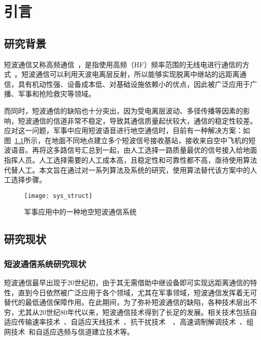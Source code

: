 
\chapter{引言}
\label{chapter:introduction}

\section{研究背景}

短波通信又称高频通信~\cite{胡中豫2003现代短波通信}，是指使用高频（HF）频率范围的无线电进行通信的方式~\cite{董彬虹2007短波通信的现状及发展趋势}。短波通信可以利用天波电离层反射，所以能够实现脱离中继站的远距离通信，具有机动性强、设备成本低、对基础设施依赖小的优点，因此被广泛应用于广播、军事和抢险救灾等领域。

而同时，短波通信的缺陷也十分突出，因为受电离层波动、多径传播等因素的影响，短波通信的信道非常不稳定，导致其通信质量起伏较大，通信的稳定性较差。应对这一问题，军事中应用短波语音进行地空通信时，目前有一种解决方案：如图~\ref{fig:sys_struct}所示，在地面不同地点建立多个短波信号接收基站，接收来自空中飞机的短波语音。再将这多路信号汇总到一起，由人工选择一路质量最优的信号接入给地面指挥人员。人工选择需要的人工成本高，且稳定性和可靠性都不高，亟待使用算法代替人工。本文旨在通过对一系列算法及系统的研究，使用算法替代该方案中的人工选择步骤。

\begin{figure}
\centering
\texttt{[image: sys\_struct]}
\caption{军事应用中的一种地空短波通信系统\label{fig:sys_struct}}
\end{figure}

\section{研究现状}

\subsection{短波通信系统研究现状}

短波通信最早出现于20世纪初，由于其无需借助中继设备即可实现远距离通信的特性，直到今日依然被广泛应用于各个领域，尤其在军事领域，短波通信发挥着无可替代的最低通信保障作用。在此期间，为了弥补短波通信的缺陷，各种技术层出不穷，尤其从20世纪80年代以来，短波通信技术得到了长足的发展。相关技术包括自适应传输速率技术~\cite{clarke2003multilevel}、自适应天线技术~\cite{cook2012adaptive}、抗干扰技术~\cite{andersson1995performance}~\cite{zander1995adaptive}、高速调制解调技术~\cite{nilsson1997wideband}、组网技术~\cite{罗秋霞2000短波组网技术探讨}和自适应选频与信道建立技术等。

